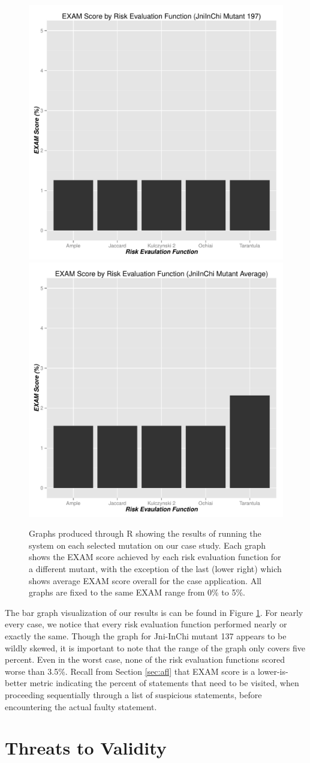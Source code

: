 \begin{figure}[tb]
\includegraphics[width=0.4\linewidth]{img/graph_197.pdf}
\hspace{0.1\linewidth}
\includegraphics[width=0.4\linewidth]{img/graph_avg.pdf}

\caption{Graphs produced through R showing the results of running
the system on each selected mutation on our case study.  Each graph
shows the EXAM score achieved by each risk evaluation function for a
different mutant, with the exception of the last (lower right) which
shows average EXAM score overall for the case application.  All graphs
are fixed to the same EXAM range from 0\% to 5\%.}
\label{fig:results}
\end{figure}

The bar graph visualization of our results is can be found in Figure \ref{fig:results}.  For nearly every case, 
we notice that every risk evaluation function performed nearly or exactly the same.  Though the 
graph for Jni-InChi mutant 137 appears to be wildly skewed, it is important to note that the range of the
graph only covers five percent.  Even in the worst case, none of the risk evaluation functions scored
worse than 3.5\%.  Recall from Section \ref{sec:afl} that EXAM score is a lower-is-better metric
indicating the percent of statements that need to be visited, when proceeding sequentially through a 
list of suspicious statements, before encountering the actual faulty statement.


\section{Threats to Validity}\label{sec:valid}


